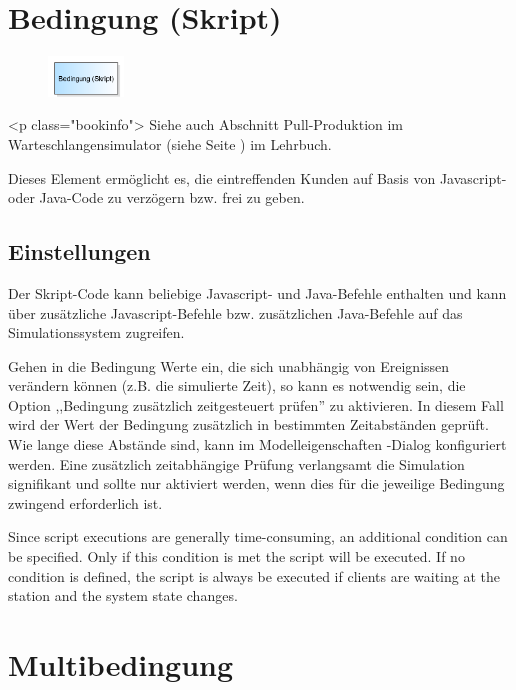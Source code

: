 \section{Bedingung (Skript)}
\label{ref:ModelElementHoldJS}

\begin{figure}
\vspace{-22pt}
\includegraphics[width=2cm]{imageModelElementHoldJS.png}
\vspace{-22pt}
\end{figure}

<p class="bookinfo">
Siehe auch Abschnitt Pull-Produktion im Warteschlangensimulator (siehe Seite \pageref{ref:book:7.6.3}) im Lehrbuch.

Dieses Element ermöglicht es, die eintreffenden Kunden auf Basis von Javascript-
oder Java-Code zu verzögern bzw. frei zu geben.

\subsection*{Einstellungen}

Der Skript-Code kann beliebige Javascript- und Java-Befehle enthalten und kann über
zusätzliche Javascript-Befehle bzw. zusätzlichen Java-Befehle 
auf das Simulationssystem zugreifen.

Gehen in die Bedingung Werte ein, die sich unabhängig von Ereignissen verändern können (z.B. die simulierte Zeit), so kann es notwendig sein,
die Option ,,Bedingung zusätzlich zeitgesteuert prüfen'' zu aktivieren. In diesem Fall wird der Wert der Bedingung zusätzlich in bestimmten
Zeitabständen geprüft. Wie lange diese Abstände sind, kann im Modelleigenschaften -Dialog konfiguriert
werden. Eine zusätzlich zeitabhängige Prüfung verlangsamt die Simulation signifikant und sollte nur aktiviert werden, wenn dies für die
jeweilige Bedingung zwingend erforderlich ist.

Since script executions are generally time-consuming, an additional condition can be specified.
Only if this condition is met the script will be executed. If no condition is defined, the script
is always be executed if clients are waiting at the station and the system state changes.


\section{Multibedingung}
\label{ref:ModelElementHoldMulti}

